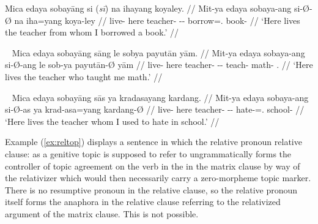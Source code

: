\pex\label{ex:reltop}
\begingl
	\gla *Mica edaya sobayāng {si \textup{(\ques{}\textit{sī})}} na ihayang 
		koyaley. //
	\glb Mit-ya edaya sobaya-ang si-Ø-Ø na iha=yang koya-ley //
	\glc live-\TsgM{} here teacher-\Aarg{} \Rel{}-\Aarg{}-\Top{} \GenT{} 
		borrow=\Fsg{}.\Aarg{} book-\PargI{} //
% 
	\glft `Here lives the teacher from whom I borrowed a book.' //
\endgl
\xe

\pex~\label{ex:relagt}
\begingl
	\gla *Mica edaya sobayāng sāng le sobya payutān yām. //
	\glb Mit-ya edaya sobaya-ang si-Ø-ang le sob-ya payutān-Ø yām //
	\glc live-\TsgM{} here teacher-\Aarg{} \Rel{}-\Aarg{}-\Aarg{} \PatTI{} 
		teach-\TsgM{} math-\Top{} \Fsg{}.\Dat{} //
% 
	\glft `Here lives the teacher who taught me math.' //
\endgl
\xe

\pex~\label{ex:relpat}
\begingl
	\gla *Mica edaya sobayāng sās ya kradasayang kardang. //
	\glb Mit-ya edaya sobaya-ang si-Ø-as ya krad-asa=yang kardang-Ø //
	\glc live-\TsgM{} here teacher-\Aarg{} \Rel{}-\Aarg{}-\Parg{} \LocT{}
		hate-\Hab{}=\Fsg{}.\Aarg{} school-\Top{} //
% 
	\glft `Here lives the teacher whom I used to hate in school.' //
\endgl
\xe

Example (\ref{ex:reltop}) displays a sentence in which the relative pronoun 
relative clause:  as a genitive topic is supposed to refer to 
ungrammatically forms the controller of topic agreement on the verb in the 
 in the matrix clause by way of the relativizer 
 which would then necessarily carry a zero-morpheme topic 
marker. There is no resumptive pronoun in the relative clause, so the relative 
pronoun itself forms the anaphora in the relative clause referring to the 
relativized argument of the matrix clause. This is not possible.

